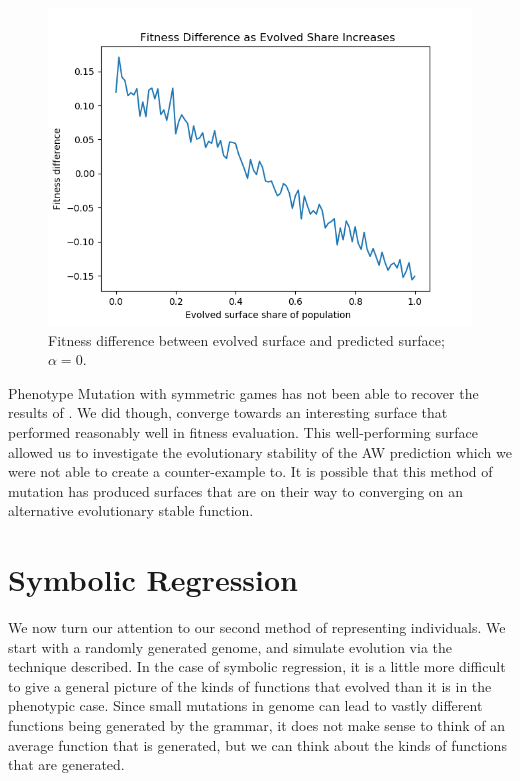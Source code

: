 \documentclass[11pt]{book}
\newcommand*{\np}{\par\noindent\newline}
\begin{document}
\begin{figure}
	\centering
	\includegraphics[scale=0.7]{resources/linegraph_fitness_difference_increasing_epsilon.png}
	\caption{Fitness difference between evolved surface and predicted surface; $\alpha = 0$.}
	\label{linegraph_fitness_difference_increasing_epsilon}
\end{figure}

\np Phenotype Mutation with symmetric games has not been able to recover the results of \citet{alger_generalization_2012}.
We did though, converge towards an interesting surface that performed reasonably well in fitness evaluation.
This well-performing surface allowed us to investigate the evolutionary stability of the AW prediction which we were not able to create a counter-example to. 
It is possible that this method of mutation has produced surfaces that are on their way to converging on an alternative evolutionary stable function.

\section{Symbolic Regression}

We now turn our attention to our second method of representing individuals.
We start with a randomly generated genome, and simulate evolution via the technique described.
In the case of symbolic regression, it is a little more difficult to give a general picture of the kinds of functions that evolved than it is in the phenotypic case.
Since small mutations in genome can lead to vastly different functions being generated by the grammar, it does not make sense to think of an average function that is generated,
but we can think about the kinds of functions that are generated.
\end{document}
